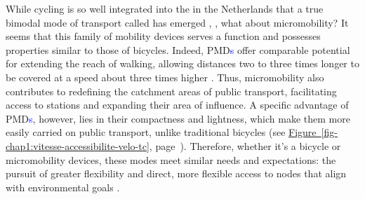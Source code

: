\begin{refsegment}
While cycling is so well integrated into the  in the Netherlands that a true bimodal mode of transport called  has emerged \textcolor{blue}{\autocite[129-148]{bruntlett_curbing_2020}}, , what about micromobility? It seems that this family of mobility devices serves a function and possesses properties similar to those of bicycles. Indeed, \acrshort{PMD}\textcolor{blue}{s} offer comparable potential for extending the reach of walking, allowing distances two to three times longer to be covered at a speed about three times higher \textcolor{blue}{\autocite{rabaud_micromobilites_2019}}. Thus, micromobility also contributes to redefining the catchment areas of public transport, facilitating access to stations and expanding their area of influence. A specific advantage of \acrshort{PMD}\textcolor{blue}{s}, however, lies in their compactness and lightness, which make them more easily carried on public transport, unlike traditional bicycles (see \hyperref[fig-chap1:vitesse-accessibilite-velo-tc]{Figure~\ref{fig-chap1:vitesse-accessibilite-velo-tc}}, page~\pageref{fig-chap1:vitesse-accessibilite-velo-tc}). Therefore, whether it’s a bicycle or micromobility devices, these modes meet similar needs and expectations: the pursuit of greater flexibility and direct, more flexible access to nodes that align with environmental goals \textcolor{blue}{\autocite[80]{oostendorp_combining_2018}}.%


\end{refsegment}
